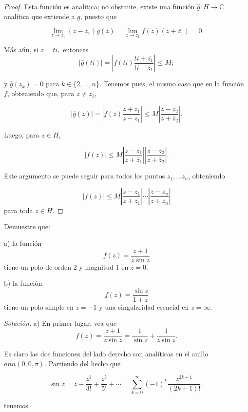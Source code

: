 \documentclass[12pt]{article}
\newcommand{\C}{\mathbb{C}}
\newenvironment{problem}[2][Problema]{\begin{trivlist}
\item[\hskip \labelsep {\bfseries #1}\hskip \labelsep {\bfseries #2.}]}{\end{trivlist}}
\begin{document}
\begin{proof}
Esta función es analítica; no obstante, existe una función $\hat g: H \rightarrow \C$ analítica que extiende a $g$, puesto que 

$$\lim_{z \to z_1} (z -z_1)g(z) = \lim_{z\to z_1} f(z) (z+\overline{z_1}) = 0.$$

Más aún, si $z = ti,$ entonces 
$$ \lvert \hat g(ti) \rvert  = \left \lvert f(ti) \frac{ti + \overline{z_1}}{ti - z_1} \right \rvert \leq M;$$

y $\hat g(z_k) = 0$ para $k \in \{2, \ldots, n\}$. Tenemos pues, el mismo caso que en la función $f$, obteniendo que, para $z \neq z_1$,

$$\lvert \hat g(z) \rvert = \left\lvert f(z) \frac{z+\overline z_1}{z - z_1} \right\rvert \leq M \left\lvert \frac{z-z_2}{z+\overline z_2} \right\rvert. $$

Luego, para $z \in H$,

$$\lvert f(z) \rvert \leq M \left \lvert \frac{z - z_1}{z + \overline z_1} \right\rvert \left\lvert \frac{z - z_2}{z + \overline{z}_2} \right\rvert.$$

Este argumento se puede seguir para todos los puntos $z_1, \ldots z_n$, obteniendo 

$$\lvert f(z) \rvert \leq M \left \lvert \frac{z - z_1}{z + \overline z_1} \right\rvert \cdots \left\lvert \frac{z - z_n}{z + \overline{z}_n} \right\rvert$$
para toda $z \in H.$
\end{proof}


\begin{problem}{3, enero 2015}
Demuestre que:

a) la función
$$f(z) = \frac{z+1}{z \sin z}$$
tiene un polo de orden 2 y magnitud 1 en $z=0$.

b) la función
$$ f(z) = \frac{\sin z}{1+z}$$
tiene un polo simple en $z=-1$ y una singularidad esencial en $z=\infty.$
\end{problem}

\textit{Solución.} a) En primer lugar, vea que
$$f(z) = \frac{z+1}{z \sin z} = \frac{1}{\sin z} + \frac{1}{z \sin z}.$$

Es claro las dos funciones del lado derecho son analíticas en el anillo $ann(0, 0, \pi).$ Partiendo del hecho que

$$ \sin z = z - \frac{z^3}{3!} + \frac{z^5}{5!} + \cdots = \sum_{k=0}^\infty (-1)^{k} \frac{z^{2k+1}}{(2k+1)!},$$

tenemos 
\end{document}
